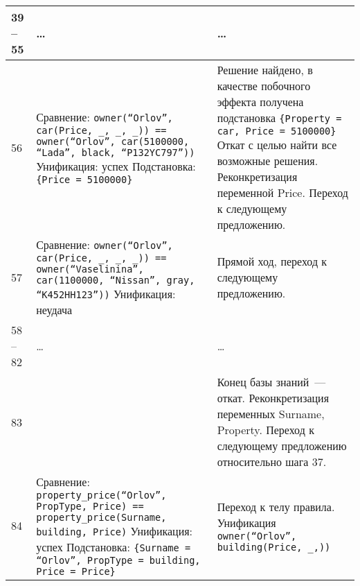 \begin{xltabular}{\textwidth}{|l|X|Y|}
		39 -- 55 & \centering \dots & \dots \\ \hline
		
		56 &
		Сравнение:\newline
		\texttt{owner(``Orlov'', car(Price, \_, \_, \_)) == owner(``Orlov'', car(5100000, ``Lada'', black, ``P132YC797''))} \newline\newline
		Унификация: успех \newline\newline
		Подстановка: \texttt{\{Price = 5100000\}} & 
		Решение найдено, в качестве побочного эффекта получена подстановка \texttt{\{Property = car, Price = 5100000\}} \newline\newline 
		Откат с целью найти все возможные решения.
		Реконкретизация переменной Price.
		Переход к следующему предложению.\\ \hline
		
		57 &
		Сравнение:\newline
		\texttt{owner(``Orlov'', car(Price, \_, \_, \_)) == owner(``Vaselinina'', car(1100000, ``Nissan'', gray, ``K452HH123''))} \newline\newline
		Унификация: неудача &
		Прямой ход, переход к следующему предложению. \\ \hline
		
		58 -- 82 & \centering \dots & \dots \\ \hline
		 
		83 &
		 &
		Конец базы знаний~--- откат.
		Реконкретизация переменных Surname, Property.
		Переход к следующему предложению относительно шага 37.\\ \hline
		
		84 &
		Сравнение:\newline
		\texttt{property\_price(``Orlov'', PropType, Price) == property\_price(Surname, building, Price)} \newline\newline
		Унификация: успех \newline\newline
		Подстановка: \texttt{\{Surname = ``Orlov'', PropType = building, Price = Price\}} & 
		Переход к телу правила. \newline\newline
		Унификация\newline
		\texttt{owner(``Orlov'', building(Price, \_,))} \\ \hline
		

\end{xltabular}
